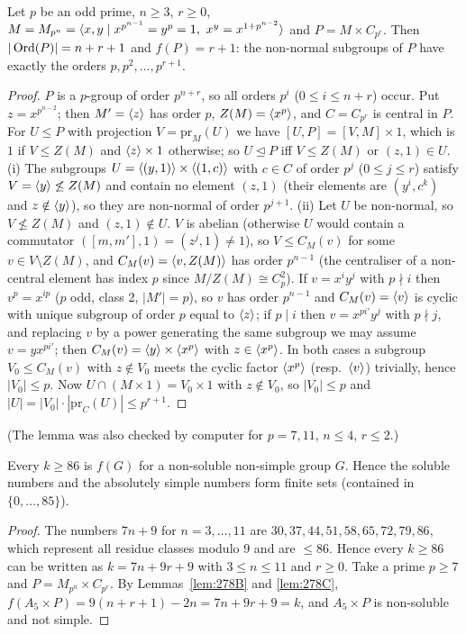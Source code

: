 \begin{lemma}\label{lem:278C}
Let $p$ be an odd prime, $n\ge 3$, $r\ge 0$, $M=M_{p^n}=\gen{x,y\mid x^{p^{n-1}}=y^p=1,\ x^y=x^{1+p^{n-2}}}$ and
$P=M\times C_{p^r}$. Then $|\operatorname{Ord}(P)|=n+r+1$ and $f(P)=r+1$: the non-normal subgroups of $P$ have exactly the orders
$p,p^2,\dots,p^{r+1}$.
\end{lemma}
\begin{proof}
$P$ is a $p$-group of order $p^{n+r}$, so all orders $p^i$ ($0\le i\le n+r$) occur. Put $z=x^{p^{n-2}}$; then
$M'=\langle z\rangle$ has order $p$, $Z(M)=\langle x^p\rangle$, and $C=C_{p^r}$ is central in $P$. For $U\le P$ with projection
$V=\mathrm{pr}_M(U)$ we have $[U,P]=[V,M]\times 1$, which is $1$ if $V\le Z(M)$ and $\langle z\rangle\times 1$ otherwise; so
$U\trianglelefteq P$ iff $V\le Z(M)$ or $(z,1)\in U$.
(i) The subgroups $U=\langle (y,1)\rangle\times\langle (1,c)\rangle$ with $c\in C$ of order $p^j$ ($0\le j\le r$) satisfy
$V=\langle y\rangle\not\le Z(M)$ and contain no element $(z,1)$ (their elements are $(y^i,c^k)$ and $z\notin\langle y\rangle$), so
they are non-normal of order $p^{j+1}$.
(ii) Let $U$ be non-normal, so $V\not\le Z(M)$ and $(z,1)\notin U$. $V$ is abelian (otherwise $U$ would contain a
commutator $([m,m'],1)=(z^j,1)\ne 1$), so $V\le C_M(v)$ for some $v\in V\setminus Z(M)$, and $C_M(v)=\langle v,Z(M)\rangle$
has order $p^{n-1}$ (the centraliser of a non-central element has index $p$ since $M/Z(M)\cong C_p^2$). If
$v=x^iy^j$ with $p\nmid i$ then $v^p=x^{ip}$ ($p$ odd, class 2, $|M'|=p$), so $v$ has order $p^{n-1}$ and
$C_M(v)=\langle v\rangle$ is cyclic with unique subgroup of order $p$ equal to $\langle z\rangle$; if $p\mid i$ then $v=x^{pi'}y^j$ with $p\nmid j$, and replacing $v$ by a power generating the same subgroup we may
assume $v=yx^{pi'}$; then $C_M(v)=\langle y\rangle\times\langle x^p\rangle$ with $z\in\langle x^p\rangle$. In both cases a subgroup $V_0\le C_M(v)$ with $z\notin V_0$
meets the cyclic factor $\langle x^p\rangle$ (resp.\ $\langle v\rangle$) trivially, hence $|V_0|\le p$. Now $U\cap(M\times 1)=V_0\times 1$
with $z\notin V_0$, so $|V_0|\le p$ and $|U|=|V_0|\cdot|\mathrm{pr}_C(U)|\le p^{r+1}$.
\end{proof}
(The lemma was also checked by computer for $p=7,11$, $n\le 4$, $r\le 2$.)

\begin{theorem}\label{thm:278main}
Every $k\ge 86$ is $f(G)$ for a non-soluble non-simple group $G$. Hence the soluble numbers and the absolutely
simple numbers form finite sets (contained in $\{0,\dots,85\}$).
\end{theorem}
\begin{proof}
The numbers $7n+9$ for $n=3,\dots,11$ are $30,37,44,51,58,65,72,79,86$, which represent all residue classes modulo 9
and are $\le 86$. Hence every $k\ge 86$ can be written as $k=7n+9r+9$ with $3\le n\le 11$ and $r\ge 0$. Take a prime
$p\ge 7$ and $P=M_{p^n}\times C_{p^r}$. By Lemmas~\ref{lem:278B} and \ref{lem:278C},
$f(A_5\times P)=9(n+r+1)-2n=7n+9r+9=k$, and $A_5\times P$ is non-soluble and not simple.
\end{proof}

